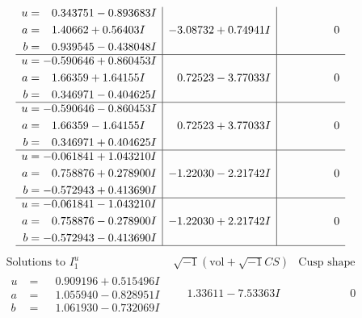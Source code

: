 \documentclass[1p]{elsarticle_modified}
\theoremstyle{definition}
\newcommand{\I}{\sqrt{-1}}
\begin{document}
$$\begin{array}{c|c|c}
\begin{aligned}
u &= \phantom{-}0.343751 - 0.893683 I \\
a &= \phantom{-}1.40662 + 0.56403 I \\
b &= \phantom{-}0.939545 - 0.438048 I\end{aligned}
 & -3.08732 + 0.74941 I & \phantom{-0.000000 } 0 \\ \hline\begin{aligned}
u &= -0.590646 + 0.860453 I \\
a &= \phantom{-}1.66359 + 1.64155 I \\
b &= \phantom{-}0.346971 - 0.404625 I\end{aligned}
 & \phantom{-}0.72523 - 3.77033 I & \phantom{-0.000000 } 0 \\ \hline\begin{aligned}
u &= -0.590646 - 0.860453 I \\
a &= \phantom{-}1.66359 - 1.64155 I \\
b &= \phantom{-}0.346971 + 0.404625 I\end{aligned}
 & \phantom{-}0.72523 + 3.77033 I & \phantom{-0.000000 } 0 \\ \hline\begin{aligned}
u &= -0.061841 + 1.043210 I \\
a &= \phantom{-}0.758876 + 0.278900 I \\
b &= -0.572943 + 0.413690 I\end{aligned}
 & -1.22030 - 2.21742 I & \phantom{-0.000000 } 0 \\ \hline\begin{aligned}
u &= -0.061841 - 1.043210 I \\
a &= \phantom{-}0.758876 - 0.278900 I \\
b &= -0.572943 - 0.413690 I\end{aligned}
 & -1.22030 + 2.21742 I & \phantom{-0.000000 } 0\\
 \hline 
 \end{array}$$\newpage$$\begin{array}{c|c|c}  
\text{Solutions to }I^u_{1}& \I (\text{vol} + \sqrt{-1}CS) & \text{Cusp shape}\\
 \hline 
\begin{aligned}
u &= \phantom{-}0.909196 + 0.515496 I \\
a &= \phantom{-}1.055940 - 0.828951 I \\
b &= \phantom{-}1.061930 - 0.732069 I\end{aligned}
 & \phantom{-}1.33611 - 7.53363 I & \phantom{-0.000000 } 0 \\ \hline\begin{aligned}

\end{aligned}
\end{array}$$
\end{document}
